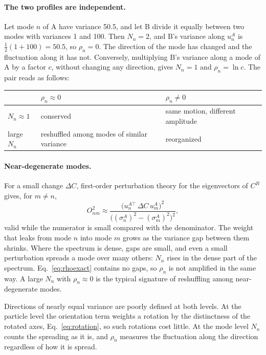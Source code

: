 \documentclass[11pt,a4paper]{article}
\begin{document}
\paragraph{The two profiles are independent.} Let mode $n$ of A have variance 50.5, and let B divide it equally between two modes with variances 1 and 100. Then $N_n = 2$, and B's variance along $u^A_n$ is $\tfrac12(1 + 100) = 50.5$, so $\rho_n = 0$. The direction of the mode has changed and the fluctuation along it has not. Conversely, multiplying B's variance along a mode of A by a factor $c$, without changing any direction, gives $N_n = 1$ and $\rho_n = \ln c$. The pair reads as follows:

\begin{center}
\begin{tabular}{lll}
\toprule
 & $\rho_n \approx 0$ & $\rho_n \neq 0$ \\
\midrule
$N_n \approx 1$ & conserved & same motion, different amplitude \\
large $N_n$ & reshuffled among modes of similar variance & reorganized \\
\bottomrule
\end{tabular}
\end{center}

\paragraph{Near-degenerate modes.} For a small change $\Delta C$, first-order perturbation theory for the eigenvectors of $C^B$ gives, for $m\neq n$,
\begin{equation}
\label{eq:firstorder}
O^2_{nm} \approx \frac{\big(u^{A\top}_n\,\Delta C\,u^A_m\big)^2}{\big((\sigma^A_n)^2 - (\sigma^A_m)^2\big)^2} ,
\end{equation}
valid while the numerator is small compared with the denominator. The weight that leaks from mode $n$ into mode $m$ grows as the variance gap between them shrinks. Where the spectrum is dense, gaps are small, and even a small perturbation spreads a mode over many others: $N_n$ rises in the dense part of the spectrum. Eq.~\eqref{eq:rhoexact} contains no gaps, so $\rho_n$ is not amplified in the same way. A large $N_n$ with $\rho_n\approx 0$ is the typical signature of reshuffling among near-degenerate modes.

Directions of nearly equal variance are poorly defined at both levels. At the particle level the orientation term weights a rotation by the distinctness of the rotated axes, Eq.~\eqref{eq:rotation}, so such rotations cost little. At the mode level $N_n$ counts the spreading as it is, and $\rho_n$ measures the fluctuation along the direction regardless of how it is spread.
\end{document}
